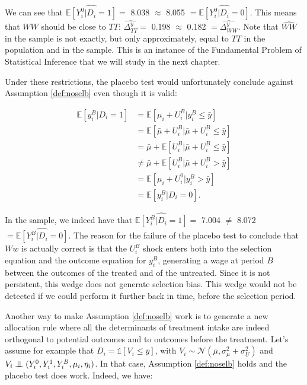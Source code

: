 \documentclass[]{book}
\newcommand{\uns}[1]{\mathds{1}[ #1 ]}
\newcommand{\esp}[1]{\mathbb{E}[ #1 ]}
\newcommand\Ind{\protect\mathpalette{\protect\independenT}{\perp}}
\def\independenT#1#2{\mathrel{\setbox0\hbox{$#1#2$}\copy0\kern-\wd0\mkern4mu\box0}}
\theoremstyle{definition}
\theoremstyle{definition}
\theoremstyle{definition}
\theoremstyle{remark}
\begin{document}
We can see that \(\hat{\esp{Y_i^0|D_i=1}}=\) 8.038 \(\approx\) 8.055
\(=\hat{\esp{Y_i^0|D_i=0}}\). This means that \(WW\) should be close to
\(TT\): \(\hat{\Delta^y_{TT}}=\) 0.198 \(\approx\) 0.182
\(=\hat{\Delta^y_{WW}}\). Note that \(\hat{WW}\) in the sample is not
exactly, but only approximately, equal to \(TT\) in the population and
in the sample. This is an instance of the Fundamental Problem of
Statistical Inference that we will study in the next chapter.

Under these restrictions, the placebo test would unfortunately conclude
against Assumption \ref{def:noselb} even though it is valid:

\begin{align*}
\esp{y_i^B|D_i=1} & = \esp{\mu_i+ U_i^B|y_i^B\leq\bar{y}}\\
                  & = \esp{\bar{\mu}+U_i^B|\bar{\mu}+U_i^B\leq\bar{y}}\\
                  & = \bar{\mu}  + \esp{U_i^B|\bar{\mu}+U_i^B\leq\bar{y}}\\
                  & \neq \bar{\mu}  + \esp{U_i^B|\bar{\mu}+U_i^B>\bar{y}}\\
                  & = \esp{\mu_i+U_i^0|y_i^B>\bar{y}}\\
                  & = \esp{y_i^B|D_i=0}.                  
\end{align*}

In the sample, we indeed have that \(\hat{\esp{Y_i^B|D_i=1}}=\) 7.004
\(\neq\) 8.072 \(=\hat{\esp{Y_i^B|D_i=0}}\). The reason for the failure
of the placebo test to conclude that \(Ww\) is actually correct is that
the \(U_i^B\) shock enters both into the selection equation and the
outcome equation for \(y_i^B\), generating a wage at period \(B\)
between the outcomes of the treated and of the untreated. Since it is
not persistent, this wedge does not generate selection bias. This wedge
would not be detected if we could perform it further back in time,
before the selection period.

Another way to make Assumption \ref{def:noselb} work is to generate a
new allocation rule where all the determinants of treatment intake are
indeed orthogonal to potential outcomes and to outcomes before the
treatment. Let's assume for example that \(D_i=\uns{V_i\leq\bar{y}}\),
with \(V_i\sim\mathcal{N}(\bar{\mu},\sigma^2_{\mu}+\sigma^2_{U})\) and
\(V_i\Ind(Y_i^0,Y_i^1,Y_i^B,\mu_i,\eta_i)\). In that case, Assumption
\ref{def:noselb} holds and the placebo test does work. Indeed, we have:
\end{document}
